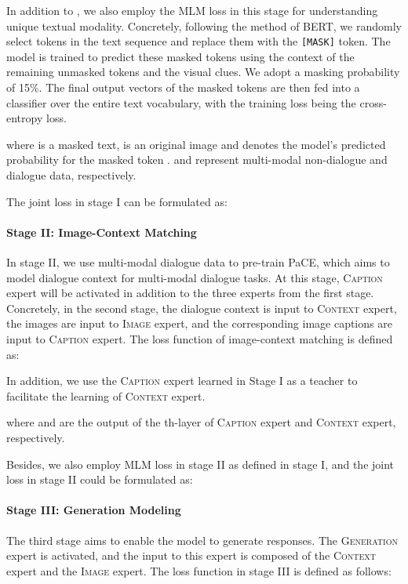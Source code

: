 \documentclass[11pt]{article}
\begin{document}
In addition to , we also employ the MLM loss  in this stage for  understanding unique textual modality.
Concretely, following the method of BERT, we randomly select tokens in the text sequence and replace them with the \texttt{[MASK]} token. The model is trained to predict these masked tokens using the context of the remaining unmasked tokens and the visual clues. We adopt a masking probability of 15\%. The final output vectors of the masked tokens are then fed into a classifier over the entire text vocabulary, with the training loss being the cross-entropy loss.

where  is a masked text,  is an original image and  denotes the model's predicted probability for the masked token . 
 and  represent multi-modal non-dialogue and dialogue data, respectively.

The joint loss in stage I can be formulated as:


\paragraph{Stage II: Image-Context Matching}
In stage II, we use multi-modal dialogue data  to pre-train PaCE, which aims to model dialogue context for multi-modal dialogue tasks. At this stage,  \textsc{Caption} expert will be activated in addition to the three experts from the first stage. Concretely, in the second stage, the dialogue context  is input to \textsc{Context} expert, the images  are input to \textsc{Image} expert, and the corresponding image captions  are input to  \textsc{Caption} expert. The loss function of  image-context matching is defined as:

In addition, we use the \textsc{Caption} expert learned in Stage I as a teacher to facilitate the learning of \textsc{Context} expert.

where  and  are the output of the th-layer of \textsc{Caption} expert and \textsc{Context} expert, respectively.

Besides, we also employ MLM loss in stage II as defined in stage I, and the joint loss  in stage II could be formulated as:


\paragraph{Stage III: Generation Modeling}
The third stage aims to enable the model to generate responses. The \textsc{Generation} expert is activated, and the input to this expert is composed of the \textsc{Context} expert and the \textsc{Image} expert. The loss function in stage III is defined as follows:
\end{document}
